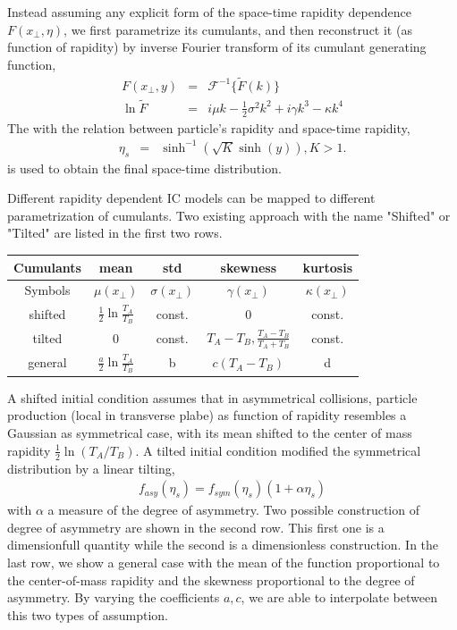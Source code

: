 \documentclass[aps,prl,twocolumn,groupedaddress]{revtex4-1}
\begin{document}
	Instead assuming any explicit form of the space-time rapidity dependence $F(x_\perp, \eta)$, we first parametrize its cumulants, and then reconstruct it (as function of rapidity) by inverse Fourier transform of its cumulant generating function,
	\begin{eqnarray}
	 	F(x_\perp,y) &=& \mathcal{F}^{-1}\{\tilde{F}(k)\} \\
	 	\ln \tilde{F} &=&  i \mu k - \frac{1}{2}\sigma^2 k^2 + i 	\gamma k^3  - \kappa k^4
	\end{eqnarray}
The	with the relation between particle's rapidity and space-time rapidity,
	\begin{eqnarray}
		\eta_s &=& \sinh^{-1}(\sqrt{K}\sinh(y)), K>1. 
	\end{eqnarray}
is used to obtain the final space-time distribution.

	Different rapidity dependent IC models can be mapped to different parametrization of cumulants. Two existing approach with the name "Shifted" or "Tilted" are listed in the first two rows.
	\begin{center}
	\begin{tabular}{c|c|c|c|c}
	\hline
	Cumulants & mean &	std	& skewness	& kurtosis \\
	\hline
	Symbols	&	$\mu(x_\perp)$ & $\sigma(x_\perp)$& $\gamma(x_\perp)$  & $\kappa(x_\perp)$	\\
	\hline
	shifted & $\frac{1}{2}\ln\frac{T_A}{T_B}$ & const. &  $0$	&const.\\
	tilted & $0$ & const.& $T_A - T_B, \frac{T_A-T_B}{T_A+T_B}$	& const.\\
	general & $\frac{a}{2}\ln\frac{T_A}{T_B}$& b  & $c(T_A - T_B)$ & d \\
	\hline
	\end{tabular}
	\end{center}
	A shifted initial condition assumes that in asymmetrical collisions, particle production (local in transverse plabe) as function of rapidity resembles a Gaussian as symmetrical case, with its mean shifted to the center of mass rapidity $\frac{1}{2}\ln(T_A/T_B)$. A tilted initial condition modified the symmetrical distribution by a linear tilting,
	\begin{eqnarray}
	f_{asy}(\eta_s) = f_{sym}(\eta_s) (1+\alpha \eta_s)
	\end{eqnarray}
	with $\alpha$ a measure of the degree of asymmetry. 
	Two possible construction of degree of asymmetry are shown in the second row. 
	This first one is a dimensionfull quantity while the second is a dimensionless construction. 
	In the last row, we show a general case with the mean of the function proportional to the center-of-mass rapidity and the skewness proportional to the degree of asymmetry. 
	By varying the coefficients $a, c$, we are able to interpolate between this two types of assumption.
	
\end{document}
